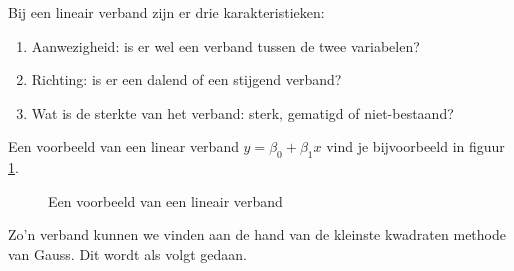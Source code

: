 Bij een lineair verband zijn er drie karakteristieken:

\begin{enumerate}
  \item Aanwezigheid: is er wel een verband tussen de twee variabelen?
  \item Richting: is er een dalend of een stijgend verband?
  \item Wat is de sterkte van het verband: sterk, gematigd of niet-bestaand?
\end{enumerate}

Een voorbeeld van een linear verband $y = \beta_{0} + \beta_{1}x$  vind je bijvoorbeeld in figuur \ref{fig:regressieFig}.

\begin{figure}[t]
  \caption{Een voorbeeld van een lineair verband}
  \label{fig:regressieFig}
\end{figure}

Zo'n verband kunnen we vinden aan de hand van de  kleinste kwadraten methode van Gauss. Dit wordt als volgt gedaan.

